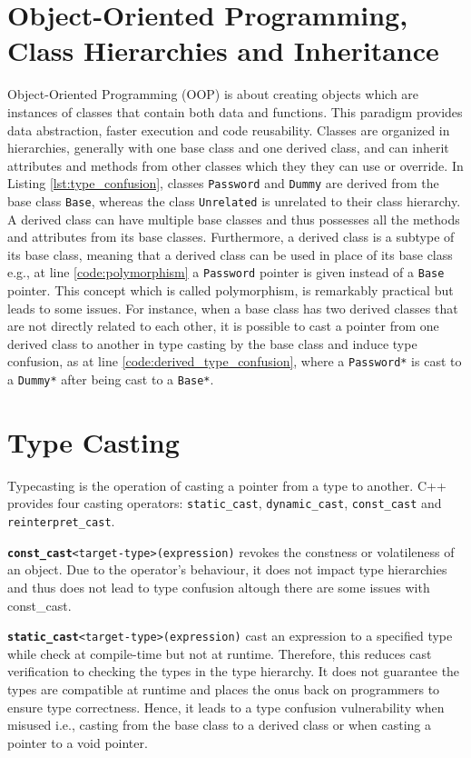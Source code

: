 \documentclass[a4paper,11pt,oneside]{report}
\begin{document}
\section{Object-Oriented Programming, Class Hierarchies and Inheritance} \label{sec:cpp_oop}
Object-Oriented Programming (OOP) is about creating objects which are instances of classes that contain both data and functions. This paradigm provides
data abstraction, faster execution and code reusability. Classes are organized in hierarchies, generally with one base class and one derived class, and can inherit attributes and methods from other classes which they
they can use or override. In Listing \autoref{lst:type_confusion}, classes \texttt{Password} and \texttt{Dummy} are derived from the base class \texttt{Base}, 
whereas the class \texttt{Unrelated} is unrelated to their class hierarchy.
A derived class can have multiple base classes and thus possesses all the methods and attributes from its base classes. 
Furthermore, a derived class is a subtype of its base class, meaning that a derived class can be used in place of its base class e.g., at line \ref{code:polymorphism}
a \texttt{Password} pointer is given instead of a \texttt{Base} pointer. This concept which is called 
polymorphism, is remarkably practical but leads to some issues. For instance, when a base class has two derived classes that are not directly related to each other, 
it is possible to cast a pointer from one derived class to another in type casting by the base class and induce type confusion, 
as at line \ref{code:derived_type_confusion}, where a \texttt{Password*} is cast to a \texttt{Dummy*} after being cast to a \texttt{Base*}. 

\section{Type Casting} \label{sec:cpp_type_casting}
Typecasting is the operation of casting a pointer from a type to another. C++ provides four casting operators: \texttt{static\_cast}, \texttt{dynamic\_cast}, 
\texttt{const\_cast} and \texttt{reinterpret\_cast}. 

\texttt{\textbf{const\_cast}<target-type>(expression)} revokes the constness or volatileness of an object. Due to the operator's behaviour, it does not impact type hierarchies and 
thus does not lead to type confusion altough there are some issues with const\_cast.

\texttt{\textbf{static\_cast}<target-type>(expression)} cast an expression to a specified type while check at compile-time but not at runtime. Therefore, this reduces cast verification to checking the types 
in the type hierarchy. It does not guarantee the types are compatible at runtime and places the onus back on programmers to ensure type correctness. Hence, it leads to a type confusion vulnerability when misused i.e.,
casting from the base class to a derived class or when casting a pointer to a void pointer.
\end{document}
